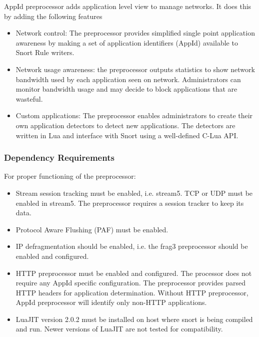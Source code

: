 \documentclass[english]{report}
\begin{document}
AppId preprocessor adds application level view to manage networks. It does this by adding the following features
\begin{itemize}

\item Network control: The preprocessor provides simplified single point application awareness by making a set of application
identifiers (AppId) available to Snort Rule writers. 

\item Network usage awareness: the preprocessor outputs statistics to
show network bandwidth used by each application seen on network. Administrators can
monitor bandwidth usage and may decide to block applications that are wasteful.

\item Custom applications: The preprocessor enables administrators to create their own application detectors
to detect new applications. The detectors are written in Lua and interface with Snort
using a well-defined C-Lua API.

\end{itemize}

\subsubsection{Dependency Requirements}

For proper functioning of the preprocessor:
\begin{itemize}

\item Stream session tracking must be enabled, i.e. stream5. TCP or UDP must be
      enabled in stream5. The preprocessor requires a session tracker to keep its
      data.

\item Protocol Aware Flushing (PAF) must be enabled.

\item IP defragmentation should be enabled, i.e. the frag3 preprocessor should be
      enabled and configured.

\item HTTP preprocessor must be enabled and configured. The processor does not require
    any AppId specific configuration. The preprocessor provides parsed HTTP headers
    for application determination. Without HTTP preprocessor, AppId preprocessor will
    identify only non-HTTP applications.

\item LuaJIT version 2.0.2 must be installed on
    host where snort is being compiled and run. Newer versions of LuaJIT are not tested for compatibility.
\end{itemize}
\end{document}
